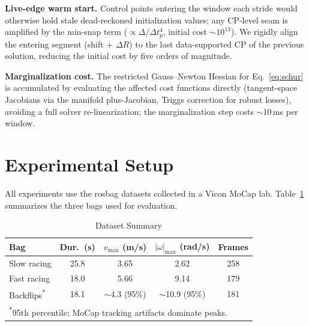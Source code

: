 \documentclass[conference]{IEEEtran}
\begin{document}
\textbf{Live-edge warm start.}
Control points entering the window each stride would otherwise hold
stale dead-reckoned initialization values; any CP-level seam is
amplified by the min-snap term ($\propto \Delta/\Delta t_p^4$, initial
cost $\sim$$10^{13}$).  We rigidly align the entering segment (shift +
$\Delta R$) to the last data-supported CP of the previous solution,
reducing the initial cost by five orders of magnitude.

\textbf{Marginalization cost.}
The restricted Gauss--Newton Hessian for Eq.~\eqref{eq:schur} is
accumulated by evaluating the affected cost functions directly
(tangent-space Jacobians via the manifold plus-Jacobian, Triggs
correction for robust losses), avoiding a full solver re-linearization;
the marginalization step costs $\sim$10\,ms per window.

\section{Experimental Setup}
\label{sec:setup}

All experiments use the rosbag datasets collected in a Vicon MoCap
lab.  Table~\ref{tab:datasets} summarizes the three bags used for
evaluation.

\begin{table}[t]
\centering
\caption{Dataset Summary}
\label{tab:datasets}
\small
\begin{tabular}{@{}lcccc@{}}
\toprule
Bag & Dur.\ (s) & $v_{\max}$ (m/s) & $|\omega|_{\max}$ (rad/s) & Frames \\
\midrule
Slow racing & 25.8 & 3.65 & 2.62 & 258 \\
Fast racing & 18.0 & 5.66 & 9.14 & 179 \\
Backflips\textsuperscript{*} & 18.1 & $\sim$4.3 (95\%) & $\sim$10.9 (95\%) & 181 \\
\bottomrule
\multicolumn{5}{l}{\textsuperscript{*}95th percentile; MoCap tracking artifacts dominate peaks.}
\end{tabular}
\end{table}
\end{document}
